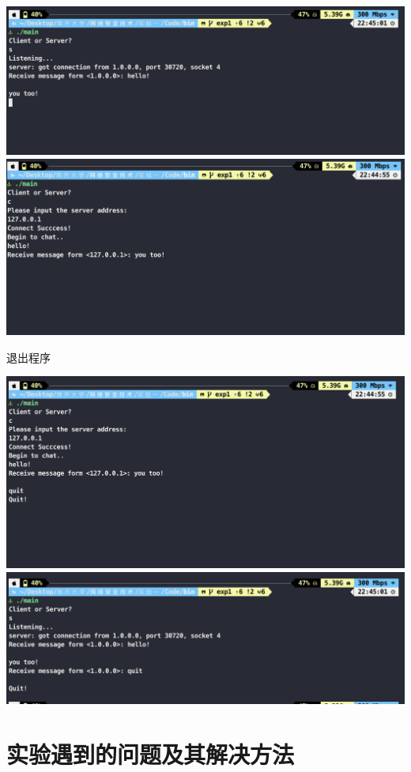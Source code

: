 \documentclass[UTF8,a4paper,10pt]{ctexart}
\begin{document}
\begin{center}
  \includegraphics[scale = 0.5]{5}
  \includegraphics[scale = 0.5]{6}
\end{center}
退出程序
\begin{center}
  \includegraphics[scale = 0.5]{7}
  \includegraphics[scale = 0.5]{8}
\end{center}

\section{实验遇到的问题及其解决方法}
\end{document}
